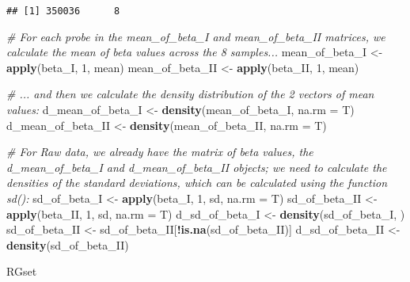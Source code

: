 \documentclass[
]{article}
\newenvironment{Shaded}{\begin{snugshade}}{\end{snugshade}}
\newcommand{\AttributeTok}[1]{\textcolor[rgb]{0.13,0.29,0.53}{#1}}
\newcommand{\CommentTok}[1]{\textcolor[rgb]{0.56,0.35,0.01}{\textit{#1}}}
\newcommand{\DecValTok}[1]{\textcolor[rgb]{0.00,0.00,0.81}{#1}}
\newcommand{\FunctionTok}[1]{\textcolor[rgb]{0.13,0.29,0.53}{\textbf{#1}}}
\newcommand{\NormalTok}[1]{#1}
\newcommand{\OtherTok}[1]{\textcolor[rgb]{0.56,0.35,0.01}{#1}}
\newcommand{\SpecialCharTok}[1]{\textcolor[rgb]{0.81,0.36,0.00}{\textbf{#1}}}
\begin{document}
\begin{Shaded}
\end{Shaded}

\begin{verbatim}
## [1] 350036      8
\end{verbatim}

\begin{Shaded}
\begin{Highlighting}[]
\CommentTok{\# For each probe in the mean\_of\_beta\_I and mean\_of\_beta\_II matrices, we calculate the mean of beta values across the 8 samples...}
\NormalTok{mean\_of\_beta\_I }\OtherTok{\textless{}{-}} \FunctionTok{apply}\NormalTok{(beta\_I, }\DecValTok{1}\NormalTok{, mean)}
\NormalTok{mean\_of\_beta\_II }\OtherTok{\textless{}{-}} \FunctionTok{apply}\NormalTok{(beta\_II, }\DecValTok{1}\NormalTok{, mean)}

\CommentTok{\# ... and then we calculate the density distribution of the 2 vectors of mean values:}
\NormalTok{d\_mean\_of\_beta\_I }\OtherTok{\textless{}{-}} \FunctionTok{density}\NormalTok{(mean\_of\_beta\_I, }\AttributeTok{na.rm =}\NormalTok{ T)}
\NormalTok{d\_mean\_of\_beta\_II }\OtherTok{\textless{}{-}} \FunctionTok{density}\NormalTok{(mean\_of\_beta\_II, }\AttributeTok{na.rm =}\NormalTok{ T)}


\CommentTok{\# For Raw data, we already have the matrix of beta values, the d\_mean\_of\_beta\_I and d\_mean\_of\_beta\_II objects; we need to calculate the densities of the standard deviations, which can be calculated using the function sd():}
\NormalTok{sd\_of\_beta\_I }\OtherTok{\textless{}{-}} \FunctionTok{apply}\NormalTok{(beta\_I, }\DecValTok{1}\NormalTok{, sd, }\AttributeTok{na.rm =}\NormalTok{ T)}
\NormalTok{sd\_of\_beta\_II }\OtherTok{\textless{}{-}} \FunctionTok{apply}\NormalTok{(beta\_II, }\DecValTok{1}\NormalTok{, sd, }\AttributeTok{na.rm =}\NormalTok{ T)}
\NormalTok{d\_sd\_of\_beta\_I }\OtherTok{\textless{}{-}} \FunctionTok{density}\NormalTok{(sd\_of\_beta\_I, )}
\NormalTok{sd\_of\_beta\_II }\OtherTok{\textless{}{-}}\NormalTok{ sd\_of\_beta\_II[}\SpecialCharTok{!}\FunctionTok{is.na}\NormalTok{(sd\_of\_beta\_II)]}
\NormalTok{d\_sd\_of\_beta\_II }\OtherTok{\textless{}{-}} \FunctionTok{density}\NormalTok{(sd\_of\_beta\_II)}

\NormalTok{RGset}
\end{Highlighting}
\end{Shaded}
\end{document}
